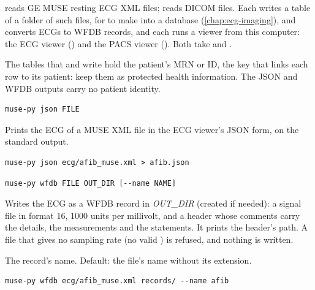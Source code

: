  reads GE MUSE resting ECG XML files;  reads DICOM files. Each writes
a table of a folder of such files, for  to make into a database
(\cref{chap:ecg-imaging}), and converts ECGs to WFDB records, and
each  runs a viewer from this computer: the ECG viewer () and the PACS
viewer (). Both take  and .

\begin{phibox}
The tables that  and  write hold the patient's MRN or
ID\phimark{}, the key that links each row to its patient: keep them as protected health
information. The JSON and WFDB outputs carry no patient identity.
\end{phibox}

\begin{lstlisting}[style=signature]
muse-py json FILE
\end{lstlisting}
Prints the ECG of a MUSE XML file in the ECG viewer's JSON form, on the standard output.
\begin{lstlisting}[style=shell]
muse-py json ecg/afib_muse.xml > afib.json
\end{lstlisting}

\begin{lstlisting}[style=signature]
muse-py wfdb FILE OUT_DIR [--name NAME]
\end{lstlisting}
Writes the ECG as a WFDB record in \textit{OUT\_DIR} (created if needed): a signal file in format
16, 1000 units per millivolt, and a header whose comments carry the details, the measurements and
the statements. It prints the header's path. A file that gives no sampling rate (no valid
) is refused, and nothing is written.
\begin{params}
\item[--name NAME] The record's name. Default: the file's name without its extension.
\end{params}
\begin{lstlisting}[style=shell]
muse-py wfdb ecg/afib_muse.xml records/ --name afib
\end{lstlisting}

